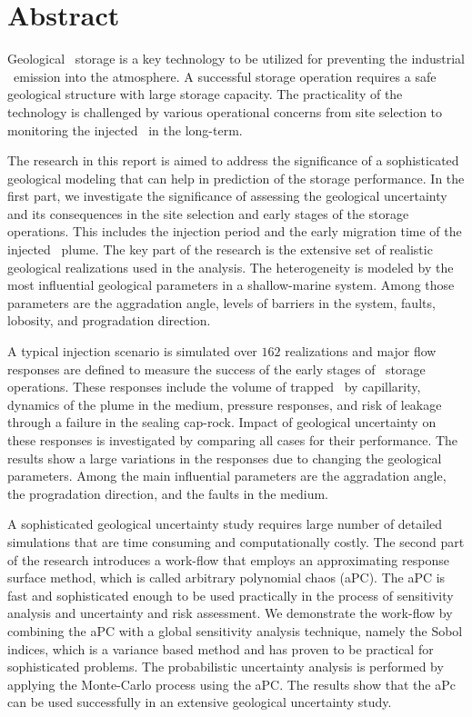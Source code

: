 \chapter{Abstract}

Geological \coo\ storage is a key technology to be utilized for preventing the industrial \coo\ emission into the atmosphere. A successful storage operation requires a safe geological structure with large storage capacity. The practicality of the technology is challenged by various operational concerns from site selection to monitoring the injected \coo\ in the long-term. 

The research in this report is aimed to address the significance of a sophisticated geological modeling that can help in prediction of the storage performance. In the first part, we investigate the significance of assessing the geological uncertainty and its consequences in the site selection and early stages of the storage operations. This includes the injection period and the early migration time of the injected \coo\ plume. The key part of the research is the extensive set of realistic geological realizations used in the analysis. The
heterogeneity is modeled by the most influential geological parameters in a shallow-marine system. Among those parameters are the aggradation angle, levels of barriers in the system, faults,
lobosity, and progradation direction. 

A typical injection scenario is simulated over $162$ realizations and major flow responses are defined to measure the success of the early stages of \coo\ storage operations. These responses include the volume of trapped \coo\ by capillarity, dynamics of the plume in the medium, pressure responses, and risk of leakage through a failure in the sealing cap-rock. Impact of geological uncertainty on these responses is investigated by comparing all cases for their performance. The results show a large variations in the responses due to changing the geological parameters. Among the main influential parameters are the aggradation angle, the progradation direction, and the faults in the medium.
 
A sophisticated geological uncertainty study requires large number of detailed simulations that are time consuming and computationally costly. The second part of the research introduces a work-flow that employs an approximating response surface method, which is called arbitrary polynomial chaos (aPC).  The aPC is fast and sophisticated enough to be used practically in the process of sensitivity analysis and uncertainty and risk assessment. We demonstrate the work-flow by combining the aPC with a global sensitivity analysis technique, namely the Sobol indices, which is a variance based method and has proven to be practical for sophisticated problems. The probabilistic uncertainty analysis is performed by applying the Monte-Carlo process using the aPC. The results show that the aPc can be used successfully in an extensive geological uncertainty study.
